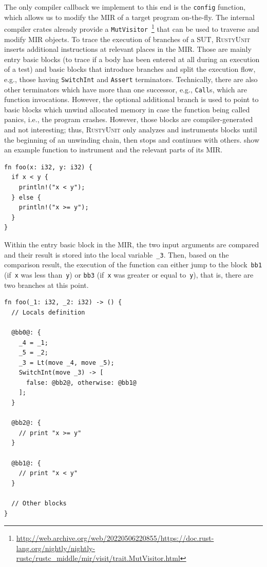 \documentclass[paper=a4,%
  twoside,%
  BCOR4mm,%
  abstract=true,%
  toc=bibliography,%
  chapterprefix=true,%
  toc=bibliographynumbered,%
  open=right,%
  english,%
  pagesize=pdftex]{scrreprt}
\newcommand{\tech}{\textsc{RustyUnit}\xspace}
\newcommand{\mir}{\ac{MIR}\xspace}
\newcommand{\sut}{\ac{SUT}\xspace}
\begin{document}
The only compiler callback we implement to this end is the \texttt{config} function, which allows us to modify the \mir of a target program on-the-fly. The internal compiler crates already provide a \texttt{MutVisitor}~\footnote{\url{http://web.archive.org/web/20220506220855/https://doc.rust-lang.org/nightly/nightly-rustc/rustc_middle/mir/visit/trait.MutVisitor.html}} that can be used to traverse and modify \mir objects. To trace the execution of branches of a \sut, \tech inserts additional instructions at relevant places in the \mir. Those are mainly entry basic blocks (to trace if a body has been entered at all during an execution of a test) and basic blocks that introduce branches and split the execution flow, e.g., those having \texttt{SwitchInt} and \texttt{Assert} terminators. Technically, there are also other terminators which have more than one successor, e.g., \texttt{Call}s, which are function invocations. However, the optional additional branch is used to point to basic blocks which unwind allocated memory in case the function being called panics, i.e., the program crashes. However, those blocks are compiler-generated and not interesting; thus, \tech only analyzes and instruments blocks until the beginning of an unwinding chain, then stops and continues with others.  show an example function to instrument and the relevant parts of its \mir.

\begin{lstlisting}[style=boxed, caption={Example function to instrument}, label=lst:example-function-to-instrument]
fn foo(x: i32, y: i32) {
  if x < y {
    println!("x < y");
  } else {
    println!("x >= y");
  }
}
\end{lstlisting}

Within the entry basic block in the \mir, the two input arguments are compared and their result is stored into the local variable~\texttt{\string_3}. Then, based on the comparison result, the execution of the function can either jump to the block~\texttt{bb1} (if~\texttt{x} was less than~\texttt{y}) or \texttt{bb3} (if~\texttt{x} was greater or equal to~\texttt{y}), that is, there are two branches at this point.
\begin{lstlisting}[language={MIR}, style=boxed, caption={\mir of the \texttt{foo} function}, label=lst:mir-of-example-function-to-instrument]
fn foo(_1: i32, _2: i32) -> () {
  // Locals definition

  @bb0@: {
    _4 = _1;
    _5 = _2;
    _3 = Lt(move _4, move _5);
    SwitchInt(move _3) -> [
      false: @bb2@, otherwise: @bb1@
    ];
  }

  @bb2@: {
    // print "x >= y"
  }

  @bb1@: {
    // print "x < y"
  }

  // Other blocks
}
\end{lstlisting}
\end{document}
